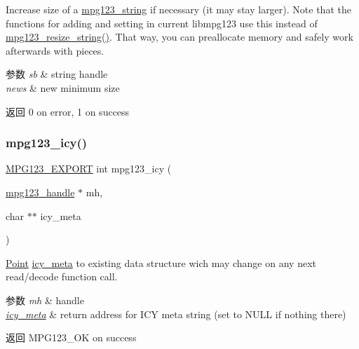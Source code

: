 Increase size of a \hyperlink{structmpg123__string}{mpg123\+\_\+string} if necessary (it may stay larger). Note that the functions for adding and setting in current libmpg123 use this instead of \hyperlink{group__mpg123__metadata_ga57ddead33785908618a5c0c7f3c1895a}{mpg123\+\_\+resize\+\_\+string()}. That way, you can preallocate memory and safely work afterwards with pieces. 
\begin{DoxyParams}{参数}
{\em sb} & string handle \\
\hline
{\em news} & new minimum size \\
\hline
\end{DoxyParams}
\begin{DoxyReturn}{返回}
0 on error, 1 on success 
\end{DoxyReturn}
\mbox{\label{group__mpg123__metadata_ga637c01818ba80ac2275b76a8abefa36c}} 
\subsubsection{\texorpdfstring{mpg123\+\_\+icy()}{mpg123\_icy()}}
{\footnotesize\ttfamily \hyperlink{mpg123_8h_a2ba98cfba3f760879df70e755b2a61cc}{M\+P\+G123\+\_\+\+E\+X\+P\+O\+RT} int mpg123\+\_\+icy (\begin{DoxyParamCaption}\item[{\hyperlink{group__mpg123__init_ga6728e2839a395f3a07d4514da659faca}{mpg123\+\_\+handle} $\ast$}]{mh,  }\item[{char $\ast$$\ast$}]{icy\+\_\+meta }\end{DoxyParamCaption})}

\hyperlink{struct_point}{Point} \hyperlink{structicy__meta}{icy\+\_\+meta} to existing data structure wich may change on any next read/decode function call. 
\begin{DoxyParams}{参数}
{\em mh} & handle \\
\hline
{\em \hyperlink{structicy__meta}{icy\+\_\+meta}} & return address for I\+CY meta string (set to N\+U\+LL if nothing there) \\
\hline
\end{DoxyParams}
\begin{DoxyReturn}{返回}
M\+P\+G123\+\_\+\+OK on success 
\end{DoxyReturn}
\mbox{\label{group__mpg123__metadata_ga0a6e45c3f8dda42ada8a07c29c253c88}} 
